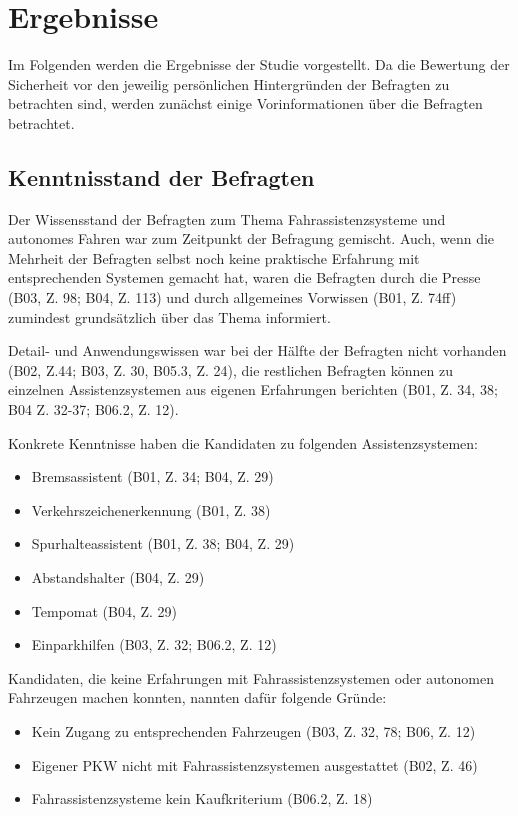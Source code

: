 \documentclass[12pt]{article}
\begin{document}
\clearpage
\section{Ergebnisse}
Im Folgenden werden die Ergebnisse der Studie vorgestellt. Da die Bewertung der Sicherheit vor den jeweilig persönlichen Hintergründen der Befragten zu betrachten sind, werden zunächst einige Vorinformationen über die Befragten betrachtet.

\subsection{Kenntnisstand der Befragten}
Der Wissensstand der Befragten zum Thema Fahrassistenzsysteme und autonomes Fahren war zum Zeitpunkt der Befragung gemischt. Auch, wenn die Mehrheit der Befragten selbst noch keine praktische Erfahrung mit entsprechenden Systemen gemacht hat, waren die Befragten durch die Presse (B03, Z. 98; B04, Z. 113) und durch allgemeines Vorwissen (B01, Z. 74ff) zumindest grundsätzlich über das Thema informiert.

Detail- und Anwendungswissen war bei der Hälfte der Befragten nicht vorhanden (B02, Z.44; B03, Z. 30, B05.3, Z. 24), die restlichen Befragten können  zu einzelnen Assistenzsystemen aus eigenen Erfahrungen berichten (B01, Z. 34, 38; B04 Z. 32-37; B06.2, Z. 12).

Konkrete Kenntnisse haben die Kandidaten zu folgenden Assistenzsystemen:
\begin{itemize}
  \item Bremsassistent (B01, Z. 34; B04, Z. 29)
  \item Verkehrszeichenerkennung (B01, Z. 38)
  \item Spurhalteassistent (B01, Z. 38; B04, Z. 29)
  \item Abstandshalter (B04, Z. 29)
  \item Tempomat (B04, Z. 29)
  \item Einparkhilfen (B03, Z. 32; B06.2, Z. 12)
\end{itemize}

Kandidaten, die keine Erfahrungen mit Fahrassistenzsystemen oder autonomen Fahrzeugen machen konnten, nannten dafür folgende Gründe:
\begin{itemize}
  \item Kein Zugang zu entsprechenden Fahrzeugen (B03, Z. 32, 78; B06, Z. 12)
  \item Eigener PKW nicht mit Fahrassistenzsystemen ausgestattet (B02, Z. 46)
  \item Fahrassistenzsysteme kein Kaufkriterium (B06.2, Z. 18)
\end{itemize}
\end{document}
